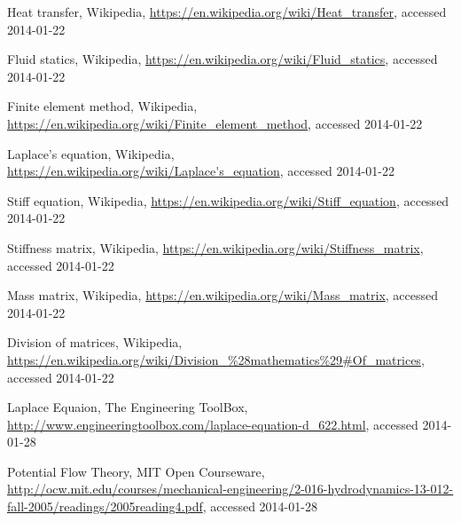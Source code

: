 \documentclass[a4paper,12pt]{article}
\begin{document}


\begin{thebibliography}{9}

  Heat transfer,
  Wikipedia,
  \url{https://en.wikipedia.org/wiki/Heat_transfer},
  accessed 2014-01-22

  Fluid statics,
  Wikipedia,
  \url{https://en.wikipedia.org/wiki/Fluid_statics},
  accessed 2014-01-22

  Finite element method,
  Wikipedia,
  \url{https://en.wikipedia.org/wiki/Finite_element_method},
  accessed 2014-01-22

  Laplace's equation,
  Wikipedia,
  \url{https://en.wikipedia.org/wiki/Laplace's_equation},
  accessed 2014-01-22

  Stiff equation,
  Wikipedia,
  \url{https://en.wikipedia.org/wiki/Stiff_equation},
  accessed 2014-01-22

  Stiffness matrix,
  Wikipedia,
  \url{https://en.wikipedia.org/wiki/Stiffness_matrix},
  accessed 2014-01-22

  Mass matrix,
  Wikipedia,
  \url{https://en.wikipedia.org/wiki/Mass_matrix},
  accessed 2014-01-22

  Division of matrices,
  Wikipedia,
  \url{https://en.wikipedia.org/wiki/Division_\%28mathematics\%29#Of_matrices},
  accessed 2014-01-22

  Laplace Equaion,
  The Engineering ToolBox,
  \url{http://www.engineeringtoolbox.com/laplace-equation-d_622.html},
  accessed 2014-01-28

  Potential Flow Theory,
  MIT Open Courseware,
  \url{http://ocw.mit.edu/courses/mechanical-engineering/2-016-hydrodynamics-13-012-fall-2005/readings/2005reading4.pdf},
  accessed 2014-01-28

\end{thebibliography}
\end{document}
